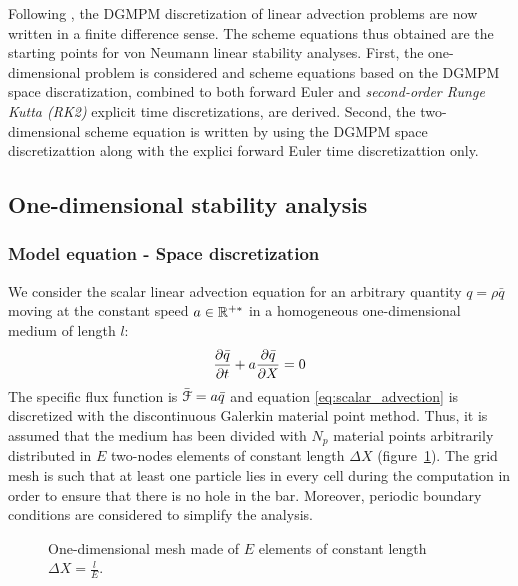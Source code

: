 Following \cite{Hirsch}, the DGMPM discretization of linear advection problems are now written in a finite difference sense. The scheme equations thus obtained are the starting points for von Neumann linear stability analyses. First, the one-dimensional problem is considered and scheme equations based on the DGMPM space discratization, combined to both forward Euler and \textit{second-order Runge Kutta (RK2)} explicit time discretizations, are derived. Second, the two-dimensional scheme equation is written by using the DGMPM space discretizattion along with the explici forward Euler time discretizattion only.

\subsection{One-dimensional stability analysis}
\subsubsection*{Model equation - Space discretization}
We consider the scalar linear advection equation for an arbitrary quantity $q=\rho \bar{q}$ moving at the constant speed $a \in \mathbb{R}^{+*}$ in a homogeneous one-dimensional medium of length $l$:
\begin{equation}
\frac{\partial \bar{q}}{\partial t} + a\frac{\partial \bar{q}}{\partial X} = 0 \label{eq:scalar_advection}
\end{equation}
The specific flux function is $\bar{\mathcal{F}} = a\bar{q}$ and equation \eqref{eq:scalar_advection} is discretized with the discontinuous Galerkin material point method. Thus, it is assumed that the medium has been divided with $N_p$ material points arbitrarily distributed in $E$ two-nodes elements of constant length $\Delta X$ (figure~\ref{fig:1Dmesh}). The grid mesh is such that at least one particle lies in every cell during the computation in order to ensure that there is no hole in the bar. Moreover, periodic boundary conditions are considered to simplify the analysis.
\begin{figure}[h!]
  \centering

  \caption{One-dimensional mesh made of $E$ elements of constant length $\Delta X = \frac{l}{E}$.}\label{fig:1Dmesh}
\end{figure}

